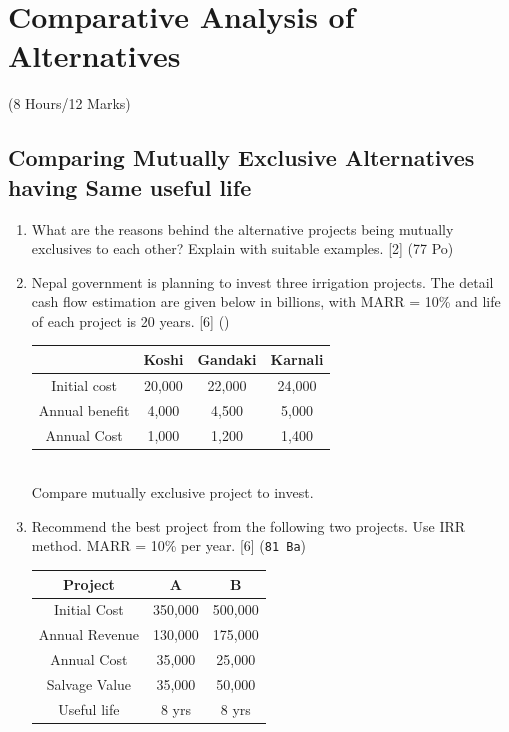 \documentclass[12pt]{article}
\begin{document}
	\pagebreak
\section{Comparative Analysis of Alternatives}
	\begin{center}(8 Hours/12 Marks)\end{center}

	\subsection{Comparing Mutually Exclusive Alternatives having Same useful life}
		\begin{enumerate}
			\item What are the reasons behind the alternative projects being mutually exclusives to each other? Explain with suitable examples. \hfill [2] (77 Po)
			
			\item Nepal government is planning to invest three irrigation projects. The detail cash flow estimation are given below in billions, with MARR = 10\% and life of each project is 20 years. \hfill [6] ()
			\begin{tabular}{|c|c|c|c|}
				\hline
				& Koshi & Gandaki & Karnali \\ \hline
				Initial cost & 20,000 & 22,000 & 24,000 \\ \hline
				Annual benefit & 4,000 & 4,500 & 5,000 \\ \hline
				Annual Cost & 1,000 & 1,200 & 1,400 \\ \hline
			\end{tabular}\\
			Compare mutually exclusive project to invest.

			\item Recommend the best project from the following two projects. Use IRR method. MARR = 10\% per year. \hfill [6] (\texttt{81 Ba})\\
			\begin{tabular}{|c|c|c|}
				\hline
				Project & A & B \\ \hline
				Initial Cost & 350,000 & 500,000 \\ \hline
				Annual Revenue & 130,000 & 175,000 \\ \hline
				Annual Cost & 35,000 & 25,000 \\ \hline
				Salvage Value & 35,000 & 50,000 \\ \hline
				Useful life & 8 yrs & 8 yrs \\ \hline
			\end{tabular}
			

\end{enumerate}
\end{document}
